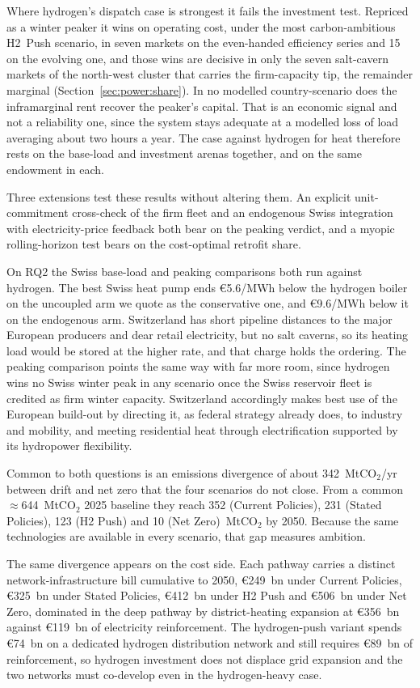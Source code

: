 Where hydrogen's dispatch case is strongest it fails the investment test. Repriced as a
winter peaker it wins on operating cost, under the most carbon-ambitious H2~Push
scenario, in seven markets on the even-handed efficiency series and 15 on the evolving
one, and those wins are decisive in only the seven
salt-cavern markets of the north-west cluster that carries the firm-capacity tip, the
remainder marginal (Section~\ref{sec:power:share}). In no modelled country-scenario does the
inframarginal rent recover the peaker's capital. That is an economic signal and not a
reliability one, since the system stays adequate at a modelled loss of load averaging
about two hours a year. The case against hydrogen for heat therefore rests on the
base-load and investment arenas together, and on the same endowment in each.

Three extensions test these results without altering them. An explicit
unit-commitment cross-check of the firm fleet and an endogenous Swiss integration with
electricity-price feedback both bear on the peaking verdict, and a myopic
rolling-horizon test bears on the cost-optimal retrofit share.

On RQ2 the Swiss base-load and peaking comparisons both run against hydrogen. The best
Swiss heat pump ends \euro{}5.6/MWh below the hydrogen boiler on the uncoupled arm we
quote as the conservative one, and \euro{}9.6/MWh below it on the endogenous arm.
Switzerland has short pipeline distances to the major European producers and dear retail
electricity, but no salt caverns, so its heating load would be stored at the higher rate,
and that charge holds the ordering. The peaking comparison points the same way with far
more room, since hydrogen wins no Swiss winter peak in any scenario once the Swiss
reservoir fleet is credited as firm winter capacity. Switzerland accordingly
makes best use of the European build-out by directing it, as federal strategy already
does, to industry and mobility, and meeting residential heat through electrification
supported by its hydropower flexibility.

Common to both questions is an emissions divergence of about 342~MtCO$_2$/yr between
drift and net zero that the four scenarios do not close. From a common
\mbox{$\approx$644~MtCO$_2$} 2025 baseline they reach 352 (Current Policies), 231 (Stated Policies), 123 (H2 Push) and 10 (Net Zero)~MtCO$_2$ by
2050. Because the same technologies are available in every scenario, that gap measures
ambition.

The same divergence appears on the cost side. Each pathway carries a distinct
network-infrastructure bill cumulative to 2050, \euro{}249~bn under Current Policies,
\euro{}325~bn under Stated Policies, \euro{}412~bn under H2 Push and \euro{}506~bn under
Net Zero, dominated in the deep pathway by district-heating expansion at \euro{}356~bn
against \euro{}119~bn of electricity reinforcement. The hydrogen-push variant spends
\euro{}74~bn on a dedicated hydrogen distribution network and still requires
\euro{}89~bn of reinforcement, so hydrogen investment does not displace grid expansion
and the two networks must co-develop even in the hydrogen-heavy case.

